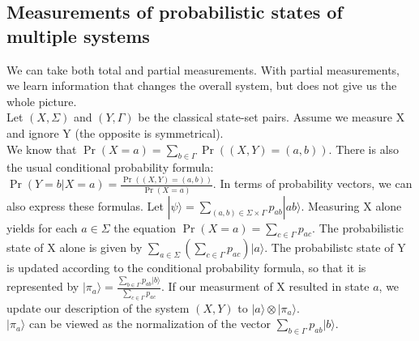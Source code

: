 \documentclass{amsart}
\begin{document}
\subsection*{Measurements of probabilistic states of multiple systems}
We can take both total and partial measurements. With partial measurements, we learn
information that changes the overall system, but does not give us the whole picture. \\
Let $ (X,\Sigma)$ and $ (Y,\Gamma) $ be the classical state-set pairs. Assume we measure X and
ignore Y (the opposite is symmetrical). \\
We know that $ \Pr(X = a) = \sum_{b \in \Gamma} \Pr((X,Y) = (a,b)) $. There is also the usual
conditional probability formula:
$ \Pr(Y = b | X = a) = \frac{\Pr((X,Y)=(a,b))}{\Pr(X=a)} $. In terms of probability vectors,
we can also express these formulas. Let $ |\psi\rangle = \sum_{(a,b) \in \Sigma \times \Gamma}
p_{ab}|ab\rangle $. Measuring X alone yields for each $ a \in \Sigma $ the equation
$ \Pr(X = a) = \sum_{c \in \Gamma} p_{ac} $. The probabilistic state of X alone is given by
$ \sum_{a \in \Sigma}(\sum_{c \in \Gamma}p_{ac}) |a\rangle $. The probabilistc state of Y is
updated according to the conditional probability formula, so that it is represented by
$ |\pi_a\rangle = \frac{\sum_{b \in \Gamma}p_{ab}|b\rangle}{\sum_{c \in \Gamma}p_{ac}} $.
If our measurment of X resulted in state $ a $, we update our description of the system
$ (X,Y) $ to $ |a\rangle \otimes |\pi_a \rangle $. \\
$ |\pi_a \rangle $ can be viewed as the normalization of the vector $ \sum_{b \in \Gamma}
p_{ab} |b\rangle $.
\end{document}

